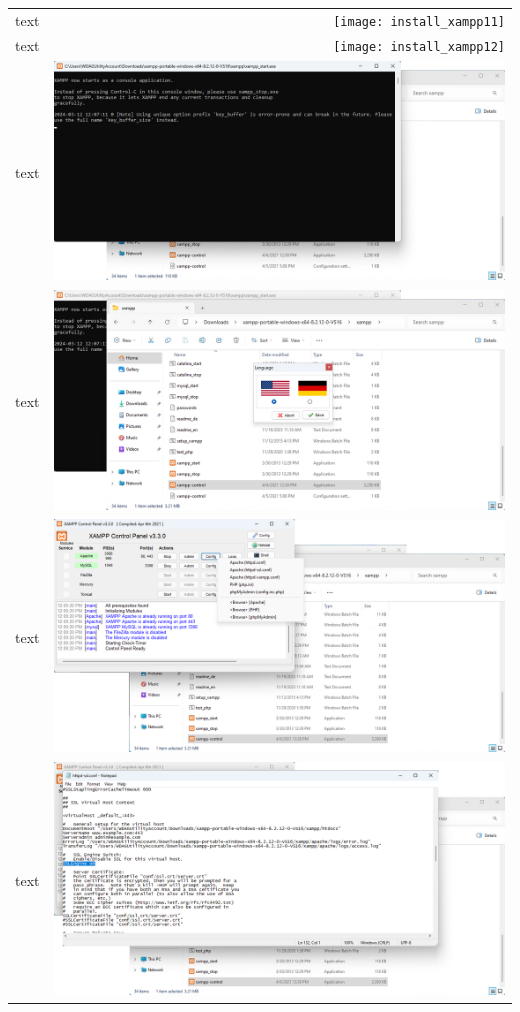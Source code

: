 \documentclass[11pt,a4paper]{report}
\begin{document}
\begin{tabular}{ l r }
            text & \texttt{[image: install\_xampp11]} \\
            text & \texttt{[image: install\_xampp12]} \\
            text & \includegraphics[scale=1.0]{install_xampp13} \\
            text & \includegraphics[scale=1.0]{install_xampp14} \\
            text & \includegraphics[scale=1.0]{install_xampp15} \\
            text & \includegraphics[scale=1.0]{install_xampp16} \\

\end{tabular}
\end{document}
